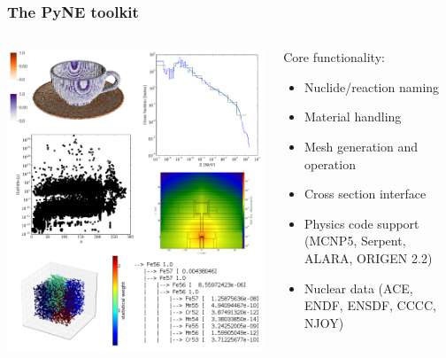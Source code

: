 \documentclass[12pt]{beamer}
\begin{document}
\begin{frame}[fragile]
\frametitle{The PyNE toolkit}

\begin{columns}
\begin{column}{0.5\textwidth}
\includegraphics[width=\textwidth]{figures/pyne_splash.png}
\end{column}
\begin{column}{0.5\textwidth}
Core functionality:
\begin{itemize}
\item{Nuclide/reaction naming}
\item{Material handling}
\item{Mesh generation and operation}
\item{Cross section interface}
\item{Physics code support (MCNP5, Serpent, ALARA, ORIGEN 2.2)}
\item{Nuclear data (ACE, ENDF, ENSDF, CCCC, NJOY)}
\end{itemize}
\end{column}
\end{columns}

\end{frame}
\end{document}

